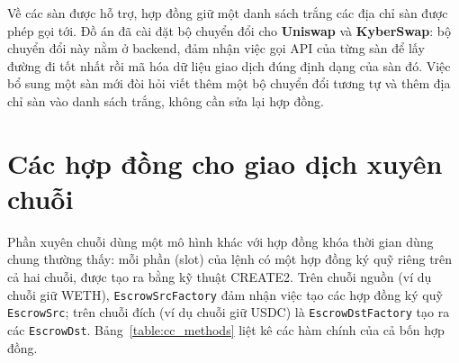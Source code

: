 \documentclass[../DoAn.tex]{subfiles}
\begin{document}
Về các sàn được hỗ trợ, hợp đồng giữ một danh sách trắng các địa chỉ sàn được phép gọi tới. Đồ án đã cài đặt bộ chuyển đổi cho \textbf{Uniswap} và \textbf{KyberSwap}: bộ chuyển đổi này nằm ở backend, đảm nhận việc gọi API của từng sàn để lấy đường đi tốt nhất rồi mã hóa dữ liệu giao dịch đúng định dạng của sàn đó. Việc bổ sung một sàn mới đòi hỏi viết thêm một bộ chuyển đổi tương tự và thêm địa chỉ sàn vào danh sách trắng, không cần sửa lại hợp đồng.

\section{Các hợp đồng cho giao dịch xuyên chuỗi}
\label{subsec:cc-contract}

Phần xuyên chuỗi dùng một mô hình khác với hợp đồng khóa thời gian dùng chung thường thấy: mỗi phần (slot) của lệnh có một hợp đồng ký quỹ riêng trên cả hai chuỗi, được tạo ra bằng kỹ thuật CREATE2. Trên chuỗi nguồn (ví dụ chuỗi giữ WETH), \texttt{EscrowSrcFactory} đảm nhận việc tạo các hợp đồng ký quỹ \texttt{EscrowSrc}; trên chuỗi đích (ví dụ chuỗi giữ USDC) là \texttt{EscrowDstFactory} tạo ra các \texttt{EscrowDst}. Bảng~\ref{table:cc_methods} liệt kê các hàm chính của cả bốn hợp đồng.
\end{document}
